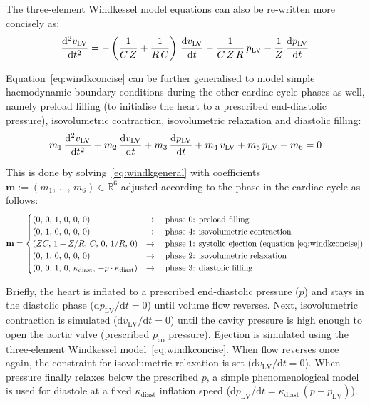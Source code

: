 \vspace{0.5cm}
\noindent
The three-element Windkessel model equations can also be re-written more concisely as:
%
\begin{equation}\label{eq:windkconcise}
    \dfrac{\mathrm{d}^2{v_{\textrm{LV}}}}{\mathrm{d}{t}^2} = -\left(\frac{1}{C\,Z}+\frac{1}{R\,C}\right)\,\dfrac{\mathrm{d}{v_{\textrm{LV}}}}{\mathrm{d}{t}}-\frac{1}{C\,Z\,R}\,p_{\textrm{LV}}-\frac{1}{Z}\,\dfrac{\mathrm{d}{p_{\textrm{LV}}}}{\mathrm{d}{t}}
\end{equation}

\vspace{0.2cm}
Equation~\eqref{eq:windkconcise} can be further generalised to model simple haemodynamic boundary conditions during the other cardiac cycle phases as well, namely preload filling (to initialise the heart to a prescribed end-diastolic pressure), isovolumetric contraction, isovolumetric relaxation and diastolic filling:
%
\begin{equation}\label{eq:windkgeneral}
    m_1\,\dfrac{\mathrm{d}^2{v_{\textrm{LV}}}}{\mathrm{d}{t}^2} + m_2\,\dfrac{\mathrm{d}{v_{\textrm{LV}}}}{\mathrm{d}{t}} + m_3\,\dfrac{\mathrm{d}{p_{\textrm{LV}}}}{\mathrm{d}{t}} + m_4\,v_{\textrm{LV}} + m_5\,p_{\textrm{LV}} +  m_6 = 0
\end{equation}

\noindent
This is done by solving~\eqref{eq:windkgeneral} with coefficients  $\mathbf{m}:=(m_1,\,\dots,\,m_6)\in\mathbb{R}^6$ adjusted according to the phase in the cardiac cycle as follows:
%
\begin{equation}
    \mathbf{m} = \begin{cases}
    (0,\,0,\,1,\,0,\,0,\,0) & \rightarrow\quad\text{phase $0$: preload filling} \\
    (0,\,1,\,0,\,0,\,0,\,0) & \rightarrow\quad\text{phase $4$: isovolumetric contraction} \\
    (ZC,\,1+Z/R,\,C,\,0,\,1/R,\,0) & \rightarrow\quad\text{phase $1$: systolic ejection (equation~\eqref{eq:windkconcise})} \\
    (0,\,1,\,0,\,0,\,0,\,0) & \rightarrow\quad\text{phase $2$: isovolumetric relaxation} \\
    (0,\,0,\,1,\,0,\,\kappa_{\textrm{diast}},\,-p\cdot \kappa_{\textrm{diast}}) & \rightarrow\quad\text{phase $3$: diastolic filling}
    \end{cases}
\end{equation}

\noindent
Briefly, the heart is inflated to a prescribed end-diastolic pressure ($p$) and stays in the diastolic phase ($\textrm{d}p_{\textrm{LV}}/\textrm{d}t=0$) until volume flow reverses. Next, isovolumetric contraction is simulated ($\textrm{d}v_{\textrm{LV}}/\textrm{d}t=0$) until the cavity pressure is high enough to open the aortic valve (prescribed $p_{\textrm{ao}}$ pressure). Ejection is simulated using the three-element Windkessel model~\eqref{eq:windkconcise}. When flow reverses once again, the constraint for isovolumetric relaxation is set ($\textrm{d}v_{\textrm{LV}}/\textrm{d}t=0$). When pressure finally relaxes below the prescribed $p$, a simple phenomenological model is used for diastole at a fixed $\kappa_{\textrm{diast}}$ inflation speed ($\textrm{d}p_{\textrm{LV}}/\textrm{d}t=\kappa_{\textrm{diast}}\,(p - p_{\textrm{LV}})$).


